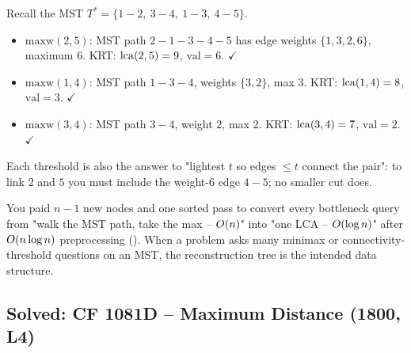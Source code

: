 \begin{tracebox}
Recall the MST \(T^{*}=\{1\!-\!2,\ 3\!-\!4,\ 1\!-\!3,\ 4\!-\!5\}\).
\begin{itemize}[nosep,leftmargin=1.4em]
  \item \(\mathrm{maxw}(2,5)\): MST path \(2\!-\!1\!-\!3\!-\!4\!-\!5\) has edge weights
        \(\{1,3,2,6\}\), maximum \(6\).  KRT: \(\operatorname{lca}(2,5)=9\), \(\mathrm{val}=6\).
        \(\checkmark\)
  \item \(\mathrm{maxw}(1,4)\): MST path \(1\!-\!3\!-\!4\), weights \(\{3,2\}\), max \(3\).
        KRT: \(\operatorname{lca}(1,4)=8\), \(\mathrm{val}=3\).  \(\checkmark\)
  \item \(\mathrm{maxw}(3,4)\): MST path \(3\!-\!4\), weight \(2\), max \(2\).
        KRT: \(\operatorname{lca}(3,4)=7\), \(\mathrm{val}=2\).  \(\checkmark\)
\end{itemize}
Each threshold is also the answer to "lightest \(t\) so edges \(\le t\) connect
the pair": to link \(2\) and \(5\) you must include the weight-\(6\) edge
\(4\!-\!5\); no smaller cut does.
\end{tracebox}

\begin{notebox}
You paid \(n-1\) new nodes and one sorted pass to convert every bottleneck query
from "walk the MST path, take the max -- \(O(n)\)" into "one LCA --
\(O(\log n)\)" after \(O(n\log n)\) preprocessing ().  When a
problem asks many minimax or connectivity-threshold questions on an MST, the
reconstruction tree is the intended data structure.
\end{notebox}

\subsection{Solved: CF 1081D -- Maximum Distance (1800, L4)}


